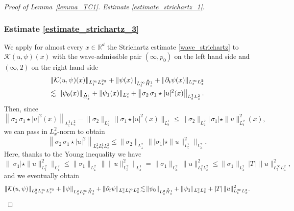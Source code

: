 \documentclass[JEP,XML,SOM,NoEqCountersInSection,NoFloatCountersInSection,Unicode,published]{cedram}
\theoremstyle{definition}
\newcommand*{\overbigdot}[1]{%
\accentset{\mbox{\large\bfseries .}}{#1}}
\newenvironment{ProofOf}[1]{\begin{proof}[Proof of #1]}{\end{proof}}
\newcommand{\R}{\mathbb{R}}
\begin{document}
\begin{ProofOf}{Lemma~\ref{lemma_TC1}. Estimate \eqref{estimate_strichartz_1}}
\subsubsection*{Estimate \eqref{estimate_strichartz_3}} We apply for almost every $x\in\R^{d}$ the Strichartz estimate \eqref{wave_strichartz} to $\mathcal{K}(u,\psi)(x)$ with the wave-admissible pair $(\infty,p_{0})$ on the left hand side and $(\infty,2)$ on the right hand side\vspace*{-3pt}
\begin{multline*}
\|\mathcal{K}(u,\psi)(x)\|_{L_{t}^{\infty}L_{z}^{p_{0}}}+\|\psi(x)\|_{L_{t}^{\infty}\overbigdot{H}_{z}^{1}}+\|\partial_{t}\psi(x)\|_{L_{t}^{\infty}L_{z}^{2}}\\
\lesssim\,\|\psi_{0}(x)\|_{\overbigdot{H}_{z}^{1}}+\|\psi_{1}(x)\|_{L_{z}^{2}}+\left\|\sigma_{2}\,\sigma_{1}\star|u|^{2}(x)\right\|_{L_{t}^{1}L_{z}^{2}}.
\end{multline*}
Then, since\vspace*{-3pt}
\[
\left\|\sigma_{2}\,\sigma_{1}\star|u|^{2}(x)\right\|_{L_{t}^{1}L_{z}^{2}}=\|\sigma_{2}\|_{L_{z}^{2}}\,\|\sigma_{1}\star|u|^{2}(x)\|_{L_{t}^{1}}\leq\|\sigma_{2}\|_{L_{z}^{2}}\,|\sigma_{1}|\star\|u\|_{L_{t}^{2}}^{2}(x),
\]
we can pass in $L_{x}^{2}$-norm to obtain\vspace*{-3pt}
\[
\left\|\sigma_{2}\,\sigma_{1}\star|u|^{2}\right\|_{L_{x}^{2}L_{t}^{1}L_{z}^{2}}\leq\|\sigma_{2}\|_{L_{z}^{2}}\,\bigl\||\sigma_{1}|\star\|u\|_{L_{t}^{2}}^{2}\bigr\|_{L_{x}^{2}}.
\]
Here, thanks to the Young inequality we have
\[
\bigl\||\sigma_{1}|\star\|u\|_{L_{t}^{2}}^{2}\bigr\|_{L_{x}^{2}}\leq \|\sigma_{1}\|_{L_{x}^{2}}\,\bigl\|\|u\|_{L_{t}^{2}}^{2}\bigr\|_{L_{x}^{1}}=\|\sigma_{1}\|_{L_{x}^{2}}\,\|u\|_{L_{t}^{2}L_{x}^{2}}^{2}\leq \|\sigma_{1}\|_{L_{x}^{2}}\,|T|\,\|u\|_{L_{t}^{\infty}L_{x}^{2}}^{2},
\]
and we eventually obtain\vspace*{-3pt}
\[
\|\mathcal{K}(u,\psi)\|_{L_{x}^{2}L_{t}^{\infty}L_{z}^{p_{0}}}+\|\psi\|_{L_{x}^{2}L_{t}^{\infty}\overbigdot{H}_{z}^{1}}+\|\partial_{t}\psi\|_{L_{x}^{2}L_{t}^{\infty}L_{z}^{2}}\!\lesssim\!\|\psi_{0}\|_{L_{x}^{2}\overbigdot{H}_{z}^{1}}+\|\psi_{1}\|_{L_{x}^{2}L_{z}^{2}}+|T|\,\|u\|_{L_{t}^{\infty}L_{x}^{2}}^{2}.
\]


\end{ProofOf}
\end{document}
